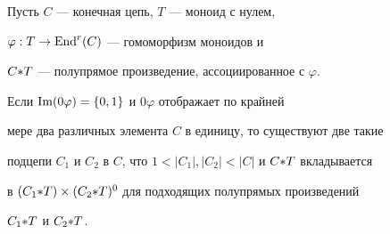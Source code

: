 \begin{lems} \label{odiv6}


Пусть $C$ --- конечная цепь, $T$ --- моноид с нулем,


$\varphi: T\rightarrow\operatorname{End}^r(C)$ --- гомоморфизм моноидов и


$C{*} T$ --- полупрямое произведение, ассоциированное с $\varphi$.


Если $\operatorname{Im}(0\varphi)=\{0,1\}$ и $0\varphi$ отображает по крайней


мере два различных элемента $C$ в единицу, то существуют две такие


подцепи $C_1$ и $C_2$ в $C$, что $1<|C_1|,|C_2|<|C|$ и $C{*} T$ вкладывается


в $(C_1{*} T)\times(C_2{*} T)^0$ для подходящих полупрямых произведений


$C_1{*} T$ и $C_2{*} T$.


\end{lems}






